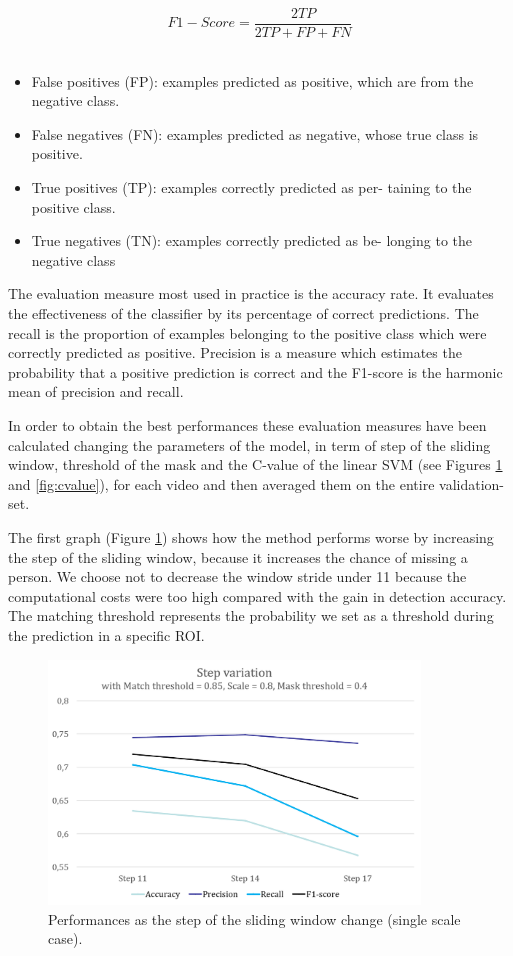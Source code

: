 \documentclass[a4paper,letterpaper, 11pt, onecolumn]{article} %
\begin{document}
$$F1-Score = \frac {2 TP}{2 TP + FP + FN}$$
\\
\begin{itemize}
\item False  positives  (FP):  examples  predicted  as  positive,
which are from the negative class.

\item False  negatives  (FN):  examples  predicted  as  negative,
whose true class is positive.

\item True positives (TP): examples correctly predicted as per-
taining to the positive class.

\item True negatives (TN): examples correctly predicted as be-
longing to the negative class
\end{itemize}

The  evaluation  measure  most  used  in  practice  is  the accuracy  rate. It  evaluates  the  effectiveness  of  the classifier by its percentage of correct predictions. The recall is the proportion of examples belonging to the positive  class  which  were  correctly  predicted  as  positive. Precision is a measure which estimates the probability that a positive prediction is correct and the F1-score is the harmonic mean of precision and recall.

In order to obtain the best performances these evaluation measures have been calculated changing the parameters of the model, in term of step of the sliding window, threshold of the mask and the C-value of the linear SVM (see Figures \ref{fig:step} and \ref{fig:cvalue}), for each video and then averaged them on the entire validation-set.

The first graph (Figure \ref{fig:step}) shows how the method performs worse by increasing the step of the sliding window, because it increases the chance of missing a person. We choose not to decrease the window stride under 11 because the computational costs were too high compared with the gain in detection accuracy. The matching threshold represents the probability we set as a threshold during the prediction in a specific ROI.
\begin{figure}[h!]
\centering
\includegraphics[height=6.5cm]{step_variation.png} 
\caption{Performances as the step of the sliding window change (single scale case).}
\label{fig:step}
\end{figure}
\end{document}
